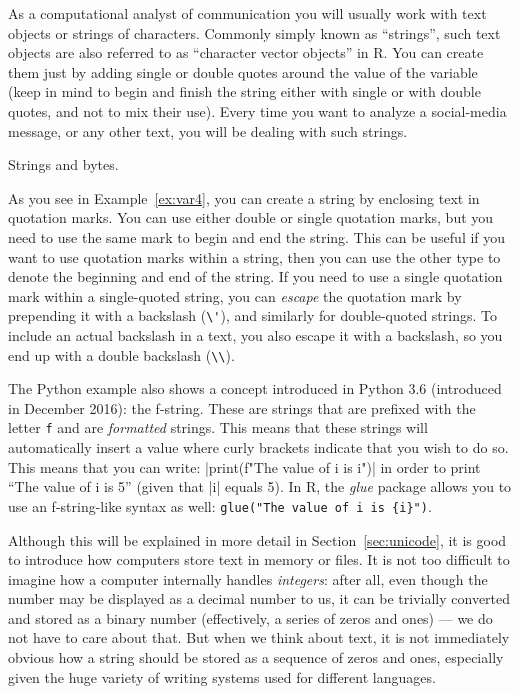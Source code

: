As a computational analyst of communication you will usually work with
text objects or strings of characters. Commonly simply known as ``strings'',
such text objects are also referred to as ``character vector objects'' in R.
You can create them just by adding single or double quotes around the value of the variable (keep in mind to begin and finish the string either with single or with double quotes, and not to mix their use). Every time you want to analyze a social-media message, or any other text, you will be dealing with such strings. 

\begin{ccsexample}
  \caption{Strings and bytes.}\label{ex:var4}
 \end{ccsexample}


As you see in Example~\ref{ex:var4}, you can create a string by enclosing  text in quotation
marks. You can use either double or single quotation marks, but you
need to use the same mark to begin and end the string. This can be
useful if you want to use quotation marks within a string, then you can
use the other type to denote the beginning and end of the string.
If you need to use a single quotation mark within a single-quoted string,
you can \emph{escape} the quotation mark by prepending it with a backslash (\verb|\'|),
and similarly for double-quoted strings.
To include an actual backslash in a text, you also escape it with a backslash,
so you end up with a double backslash (\verb|\\|). 

The Python example also shows a concept introduced in Python 3.6 (introduced in December 2016):
the f-string. These are strings that are prefixed with the letter \texttt{f} and are \emph{formatted} strings. This means that these strings will automatically insert a value where curly brackets indicate that you wish to do so. This means that you can write: |print(f"The value of i is {i}")| in order to print ``The value of i is 5'' (given that |i| equals 5).
In R, the \emph{glue} package allows you to use an f-string-like syntax as well: \texttt{glue("The value of i is \{i\}")}.

Although this will be explained in more detail in Section~\ref{sec:unicode},
it is good to introduce how computers store text in memory or files. 
It is not too difficult to imagine how a computer internally
handles \emph{integers}: after all, even though the number may be displayed
as a decimal number to us, it can be trivially converted and stored
as a binary number (effectively, a series of zeros and ones)
--- we do not have to care about that.
But when we think about text, it is not
immediately obvious how a string should be stored as a sequence of
zeros and ones, especially given the huge variety of writing systems used for different languages. 

